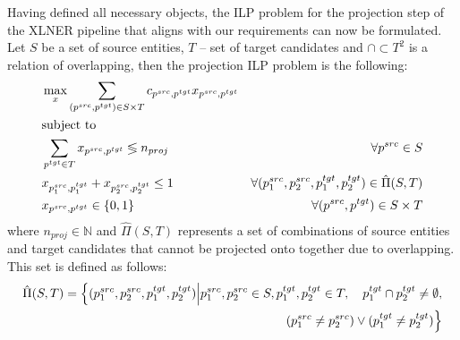Having defined all necessary objects, the ILP problem for the projection step of the XLNER pipeline that
aligns with our requirements can now be formulated.
Let \( S \) be a set of source entities, \( T \) -- set of target candidates and \( \cap \subset T^2 \) is
a relation of overlapping, then the projection ILP problem is the following:
\begin{align}
  \label{eq:objective}
  & \max\limits_x \sum\limits_{(p^{src}, p^{tgt}) \in S \times T} c_{p^{src}, p^{tgt}} x_{p^{src}, p^{tgt}}                                             \\
  & \text{subject to} \notag                                                                                                                            \\
  \label{eq:num_proj_const}
  & \sum\limits_{p^{tgt} \in T} x_{p^{src}, p^{tgt}} \lessgtr n_{proj}                                      & \forall p^{src} \in S                     \\
  \label{eq:non_overlap_const}
  & x_{p_1^{src}, p_1^{tgt}} + x_{p_2^{src}, p_2^{tgt}} \leq 1
  & \forall (p_1^{src}, p_2^{src}, p_1^{tgt}, p_2^{tgt}) \in \hat{\Pi}(S, T)                                                                            \\
  \label{eq:binary_prog}
  & x_{p^{src}, p^{tgt}} \in \{ 0, 1 \}                                                                     & \forall (p^{src}, p^{tgt}) \in S \times T
\end{align}
where \( n_{proj} \in \mathbb{N} \) and \( \hat{\Pi}(S, T) \) represents a set of combinations of
source entities and target candidates that cannot be projected onto
together due to overlapping. This set is defined as follows:
\begin{equation}  \label{eq:overlapping_set}
  \begin{aligned}
    \hat{\Pi}(S, T) = \Big\{ (p_1^{src}, p_2^{src}, p_1^{tgt}, p_2^{tgt}) \Big| p_1^{src}, p_2^{src} \in S, p_1^{tgt}, p_2^{tgt} \in T, \quad p_1^{tgt} \cap p_2^{tgt} \neq \emptyset, \\
    (p_1^{src} \neq p_2^{src}) \lor (p_1^{tgt} \neq p_2^{tgt}) \Big\}
  \end{aligned}
\end{equation}

